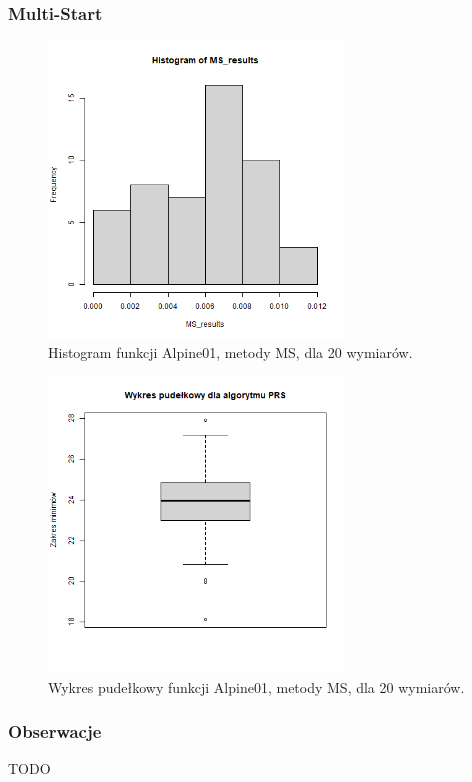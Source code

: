 \documentclass{lab}
\begin{document}
\subsubsection{Multi-Start}
\begin{figure}[H]
  \centering
  \includegraphics[width=0.7\textwidth]{img/dim20_MS_Alpine01_his.png}
  \caption{Histogram funkcji Alpine01, metody MS, dla 20 wymiarów.}
\end{figure}
\begin{figure}[H]
  \centering
  \includegraphics[width=0.7\textwidth]{img/dim20_MS_Alpine01.png}
  \caption{Wykres pudełkowy funkcji Alpine01, metody MS, dla 20 wymiarów.}
\end{figure}

\subsubsection{Obserwacje}
TODO
\end{document}
